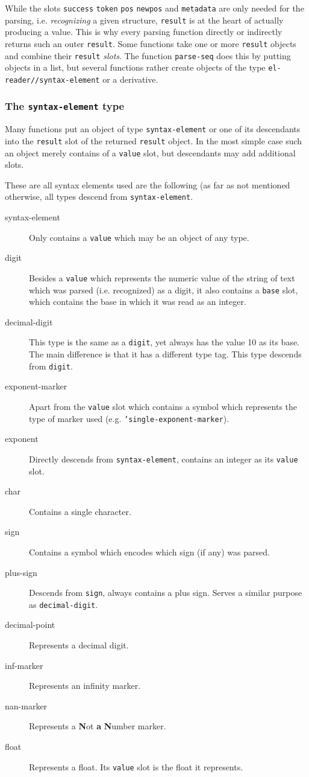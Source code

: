 \documentclass[a4paper,10pt,twoside]{report}
\newcommand{\sym}[1]{\texttt{#1}}
\newcommand{\fun}[1]{\texttt{#1}}
\begin{document}
While the slots \sym{success} \sym{token} \sym{pos} \sym{newpos} and
\sym{metadata} are only needed for the parsing, i.e. \emph{recognizing} a given
structure, \sym{result} is at the heart of actually producing a value.  This is
why every parsing function directly or indirectly returns such an outer
\sym{result}.  Some functions take one or more \sym{result} objects
and combine their \sym{result} \emph{slots}.  The function \fun{parse-seq} does
this by putting objects in a list, but several functions rather create objects
of the type \sym{el-reader//syntax-element} or a derivative.

\subsubsection{The \sym{syntax-element} type}
\label{subsubsec:syntax-element}

Many functions put an object of type \sym{syntax-element} or one of
its descendants into the \sym{result} slot of the returned
\sym{result} object.  In the most simple case such an object merely
contains of a \sym{value} slot, but descendants may add additional slots.

These are all syntax elements used are the following (as far as not mentioned
otherwise, all types descend from \sym{syntax-element}.

\begin{description}
\item[syntax-element] Only contains a \sym{value} which may be an object of any
  type. 
\item[digit] Besides a \sym{value} which represents the numeric value of the
  string of text which was parsed (i.e. recognized) as a digit, it also contains
  a \sym{base} slot, which contains the base in which it was read as an integer.
\item[decimal-digit] This type is the same as a \sym{digit}, yet always has the
  value 10 as its base.  The main difference is that it has a different type
  tag.  This type descends from \sym{digit}.
\item[exponent-marker] Apart from the \sym{value} slot which contains a
  symbol which represents the type of marker used
  (e.g. \sym{'single-exponent-marker}).
\item[exponent] Directly descends from \sym{syntax-element}, contains an integer
  as its \sym{value} slot.
\item[char] Contains a single character.
\item[sign] Contains a symbol which encodes which sign (if any) was parsed.
\item[plus-sign] Descends from \sym{sign}, always contains a plus sign.  Serves
  a similar purpose as \sym{decimal-digit}.
\item[decimal-point] Represents a decimal digit.
\item[inf-marker] Represents an infinity marker.
\item[nan-marker] Represents a \textbf{N}ot \textbf{a} \textbf{N}umber marker.
\item[float] Represents a float.  Its \sym{value} slot is the float it
  represents.
\end{description}
\end{document}
